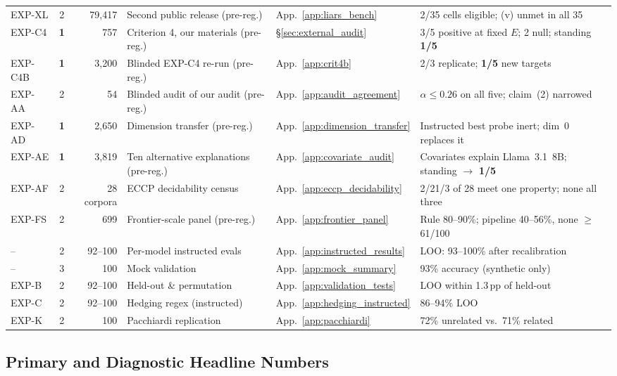 \begin{table}[t]
\begin{scriptsize}
\begin{tabular}{lcrlll}
EXP-XL & 2 & 79{,}417 & Second public release (pre-reg.) & App.~\ref{app:liars_bench} & 2/35 cells eligible; (v) unmet in all 35 \\
EXP-C4 & \textbf{1} & 757 & Criterion 4, our materials (pre-reg.) & \S\ref{sec:external_audit} & 3/5 positive at fixed $E$; 2 null; standing \textbf{1/5} \\
EXP-C4B & \textbf{1} & 3{,}200 & Blinded EXP-C4 re-run (pre-reg.) & App.~\ref{app:crit4b} & 2/3 replicate; \textbf{1/5} new targets \\
EXP-AA & 2 & 54 & Blinded audit of our audit (pre-reg.) & App.~\ref{app:audit_agreement} & $\alpha\!\leq\!0.26$ on all five; claim~(2) narrowed \\
EXP-AD & \textbf{1} & 2{,}650 & Dimension transfer (pre-reg.) & App.~\ref{app:dimension_transfer} & Instructed best probe inert; dim~0 replaces it \\
EXP-AE & \textbf{1} & 3{,}819 & Ten alternative explanations (pre-reg.) & App.~\ref{app:covariate_audit} & Covariates explain Llama~3.1~8B; standing $\to$ \textbf{1/5} \\
EXP-AF & 2 & 28 corpora & ECCP decidability census & App.~\ref{app:eccp_decidability} & 2/21/3 of 28 meet one property; none all three \\
EXP-FS & 2 & 699 & Frontier-scale panel (pre-reg.) & App.~\ref{app:frontier_panel} & Rule 80--90\%; pipeline 40--56\%, none $\geq$61/100 \\
\midrule
-- & 2 & 92--100 & Per-model instructed evals & App.~\ref{app:instructed_results} & LOO: 93--100\% after recalibration \\
-- & 3 & 100 & Mock validation & App.~\ref{app:mock_summary} & 93\% accuracy (synthetic only) \\
EXP-B & 2 & 92--100 & Held-out \& permutation & App.~\ref{app:validation_tests} & LOO within 1.3\,pp of held-out \\
EXP-C & 2 & 92--100 & Hedging regex (instructed) & App.~\ref{app:hedging_instructed} & 86--94\% LOO \\
EXP-K & 2 & 100 & Pacchiardi replication & App.~\ref{app:pacchiardi} & 72\% unrelated vs.\ 71\% related \\
\bottomrule
\end{tabular}
\end{scriptsize}
\end{table}

\subsection{Primary and Diagnostic Headline Numbers}\label{app:headlines}

